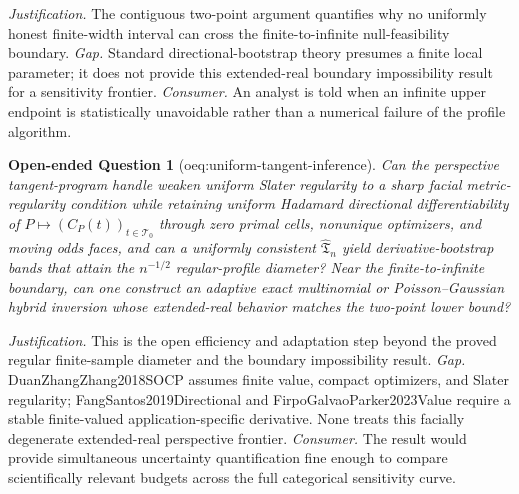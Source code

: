 \documentclass{article}
\newtheorem{openendedquestion}{Open-ended Question}
\begin{document}
\par\smallskip\noindent \textit{Justification.} The contiguous two-point argument quantifies why no uniformly honest finite-width interval can cross the finite-to-infinite null-feasibility boundary. \textit{Gap.} Standard directional-bootstrap theory presumes a finite local parameter; it does not provide this extended-real boundary impossibility result for a sensitivity frontier. \textit{Consumer.} An analyst is told when an infinite upper endpoint is statistically unavoidable rather than a numerical failure of the profile algorithm.

\begin{openendedquestion}[oeq:uniform-tangent-inference]\label{oeq:uniform-tangent-inference}
Can the perspective tangent-program handle weaken uniform Slater regularity to a sharp facial metric-regularity condition while retaining uniform Hadamard directional differentiability of \(P\mapsto(C_P(t))_{t\in\mathcal T_0}\) through zero primal cells, nonunique optimizers, and moving odds faces, and can a uniformly consistent \(\widehat{\mathfrak T}_n\) yield derivative-bootstrap bands that attain the \(n^{-1/2}\) regular-profile diameter? Near the finite-to-infinite boundary, can one construct an adaptive exact multinomial or Poisson--Gaussian hybrid inversion whose extended-real behavior matches the two-point lower bound?
\end{openendedquestion}
\par\smallskip\noindent \textit{Justification.} This is the open efficiency and adaptation step beyond the proved regular finite-sample diameter and the boundary impossibility result. \textit{Gap.} DuanZhangZhang2018SOCP assumes finite value, compact optimizers, and Slater regularity; FangSantos2019Directional and FirpoGalvaoParker2023Value require a stable finite-valued application-specific derivative. None treats this facially degenerate extended-real perspective frontier. \textit{Consumer.} The result would provide simultaneous uncertainty quantification fine enough to compare scientifically relevant budgets across the full categorical sensitivity curve.
\end{document}

